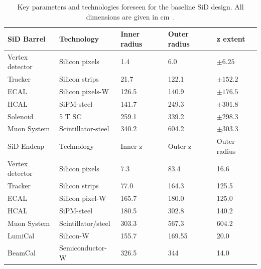 \begin{table}[h!]
\caption[Key parameters of the baseline SiD design]{Key parameters and technologies foreseen for the baseline SiD design. All dimensions are given in cm~\cite{SiDBkgNote}.}
\label{tab:KeyParametersSiD}
\centering
\begin{tabularx}{0.81\textwidth}{l|llll}
\hline\hline
SiD Barrel & Technology & Inner radius & Outer radius & z extent\\
\hline
Vertex detector & Silicon pixels & 1.4 & 6.0 & $\pm 6.25$ \\
Tracker & Silicon strips & 21.7 & 122.1 & $\pm 152.2$ \\
ECAL & Silicon pixels-W & 126.5 & 140.9 & $\pm 176.5$ \\
HCAL & SiPM-steel & 141.7 & 249.3 & $\pm 301.8$ \\
Solenoid & 5 T SC & 259.1 & 339.2 & $\pm 298.3$ \\
Muon System & Scintillator-steel & 340.2 & 604.2 & $\pm 303.3$ \\
\hline
SiD Endcap & Technology & Inner z & Outer z & Outer radius\\
\hline
Vertex detector & Silicon pixels & 7.3 & 83.4 & 16.6 \\
Tracker & Silicon strips & 77.0 & 164.3 & 125.5 \\
ECAL & Silicon pixel-W & 165.7 & 180.0 & 125.0 \\
HCAL & SiPM-steel & 180.5 & 302.8 & 140.2 \\
Muon System & Scintillator/steel & 303.3 & 567.3 & 604.2 \\
LumiCal & Silicon-W & 155.7 & 169.55 &  20.0 \\
BeamCal & Semiconductor-W & 326.5 & 344 & 14.0 \\
\hline\hline
\end{tabularx}
\end{table}

\newpage
